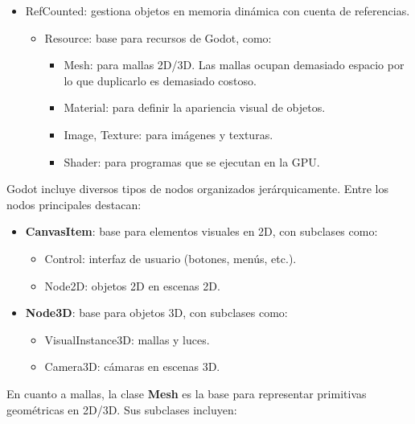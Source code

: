 \documentclass[12pt]{book} %
\providecommand{\tightlist}{%
  \setlength{\itemsep}{0pt}\setlength{\parskip}{0pt}}
\begin{document}
\begin{itemize}
\tightlist
\item
  RefCounted: gestiona objetos en memoria dinámica con cuenta de
  referencias.

  \begin{itemize}
  \tightlist
  \item
    Resource: base para recursos de Godot, como:

    \begin{itemize}
    \tightlist
    \item
      Mesh: para mallas 2D/3D. Las mallas ocupan demasiado espacio por
      lo que duplicarlo es demasiado costoso.
    \item
      Material: para definir la apariencia visual de objetos.
    \item
      Image, Texture: para imágenes y texturas.
    \item
      Shader: para programas que se ejecutan en la GPU.
    \end{itemize}
  \end{itemize}
\end{itemize}

Godot incluye diversos tipos de nodos organizados jerárquicamente. Entre
los nodos principales destacan:

\begin{itemize}
\tightlist
\item
  \textbf{CanvasItem}: base para elementos visuales en 2D, con subclases
  como:

  \begin{itemize}
  \tightlist
  \item
    Control: interfaz de usuario (botones, menús, etc.).
  \item
    Node2D: objetos 2D en escenas 2D.
  \end{itemize}
\item
  \textbf{Node3D}: base para objetos 3D, con subclases como:

  \begin{itemize}
  \tightlist
  \item
    VisualInstance3D: mallas y luces.
  \item
    Camera3D: cámaras en escenas 3D.
  \end{itemize}
\end{itemize}

En cuanto a mallas, la clase \textbf{Mesh} es la base para representar
primitivas geométricas en 2D/3D. Sus subclases incluyen:
\end{document}
